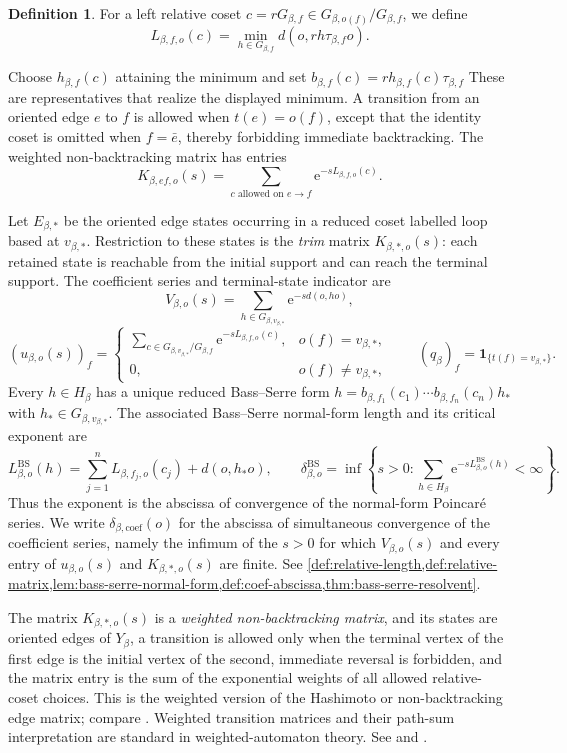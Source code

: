 \documentclass[11pt]{article}
\theoremstyle{definition}
\newtheorem*{definition*}{Definition}
\newcommand{\coef}{\mathrm{coef}}
\newcommand{\BS}{\mathrm{BS}}
\newcommand{\one}{\mathbf 1}
\newcommand{\e}{\mathrm e}
\begin{document}
\begin{definition*}
For a left relative coset $c=rG_{\beta,f}\in
G_{\beta,o(f)}/G_{\beta,f}$, we define
\[
 L_{\beta,f,o}(c)=
 \min_{h\in G_{\beta,f}}d(o,rh\tau_{\beta,f}o).
\]
\end{definition*}
Choose $h_{\beta,f}(c)$ attaining the minimum and set
$b_{\beta,f}(c)=rh_{\beta,f}(c)\tau_{\beta,f}$ These are representatives that realize the displayed minimum.  A transition from an oriented edge
$e$ to $f$ is allowed when $t(e)=o(f)$, except that the identity coset is omitted when
$f=\bar e$, thereby forbidding immediate backtracking.  The weighted non-backtracking matrix
has entries
\[
 K_{\beta,ef,o}(s)=
 \sum_{c\text{ allowed on }e\to f}\e^{-sL_{\beta,f,o}(c)}.
\]

Let $E_{\beta,*}$ be the oriented edge states occurring in a reduced coset labelled loop based
at $v_{\beta,*}$.  Restriction to these states is the \emph{trim} matrix
$K_{\beta,*,o}(s)$: each retained state is reachable from the initial support and can reach the
terminal support.  The coefficient series and terminal-state indicator are
\[
 V_{\beta,o}(s)=\sum_{h\in G_{\beta,v_{\beta,*}}}\e^{-sd(o,ho)},
\]
\[
 (u_{\beta,o}(s))_f=
 \begin{cases}
 \displaystyle\sum_{c\in G_{\beta,v_{\beta,*}}/G_{\beta,f}}
 \e^{-sL_{\beta,f,o}(c)},&o(f)=v_{\beta,*},\\[1ex]
 0,&o(f)\ne v_{\beta,*},
 \end{cases}
 \qquad
 (q_\beta)_f=\one_{\{t(f)=v_{\beta,*}\}}.
\]
Every $h\in H_\beta$ has a unique reduced Bass--Serre form
$h=b_{\beta,f_1}(c_1)\cdots b_{\beta,f_n}(c_n)h_*$ with
$h_*\in G_{\beta,v_{\beta,*}}$.  The associated Bass--Serre normal-form length and its critical exponent are
\[
 L^{\BS}_{\beta,o}(h)=
 \sum_{j=1}^nL_{\beta,f_j,o}(c_j)+d(o,h_*o),
 \qquad
 \delta^{\BS}_{\beta,o}=
 \inf\left\{s>0:\sum_{h\in H_\beta}\e^{-sL^{\BS}_{\beta,o}(h)}<\infty\right\}.
\]
Thus the exponent is the abscissa of convergence of the normal-form Poincar\'e series.  We
write $\delta_{\beta,\coef}(o)$ for the abscissa of simultaneous convergence of the
coefficient series, namely the infimum of the $s>0$ for which $V_{\beta,o}(s)$ and every
entry of $u_{\beta,o}(s)$ and $K_{\beta,*,o}(s)$ are finite.
See \cref{def:relative-length,def:relative-matrix,lem:bass-serre-normal-form,def:coef-abscissa,thm:bass-serre-resolvent}.

The matrix $K_{\beta,*,o}(s)$ is a \emph{weighted non-backtracking matrix}, and its states are
oriented edges of $Y_\beta$, a transition is allowed only when the terminal vertex of the
first edge is the initial vertex of the second, immediate reversal is forbidden, and the
matrix entry is the sum of the exponential weights of all allowed relative-coset choices.
This is the weighted version of the Hashimoto or non-backtracking edge matrix; compare
\cite[Section~1]{Hashimoto1989}.  Weighted transition matrices and their path-sum
interpretation are standard in weighted-automaton theory. See
\cite[Sections~1.1--1.2]{DrosteKuichVogler2009} and
\cite[Section~2]{Mohri2009}.
\end{document}
